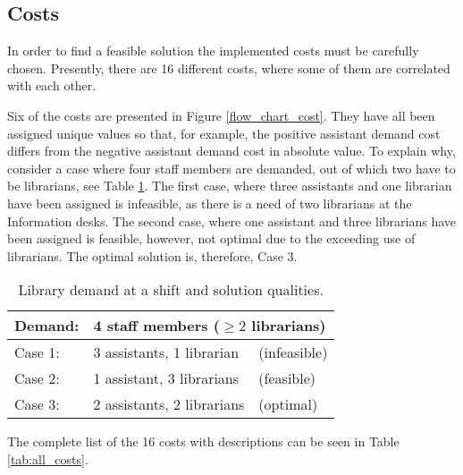     


\subsection{Costs}
In order to find a feasible solution the implemented costs must be carefully chosen. Presently, there are 16 different costs, where some of them are correlated with each other.

Six of the costs are presented in Figure \ref{flow_chart_cost}. They have all been assigned unique values so that, for example, the positive assistant demand cost differs from the negative assistant demand cost in absolute value. To explain why, consider a case where four staff members are demanded, out of which two have to be librarians, see Table \ref{library_solutions}. The first case, where three assistants and one librarian have been assigned is infeasible, as there is a need of two librarians at the Information desks. The second case, where one assistant and three librarians have been assigned is feasible, however, not optimal due to the exceeding use of librarians. The optimal solution is, therefore, Case 3.

\begin{table}[!h]
\centering
\caption{Library demand at a shift and solution qualities.}
\label{library_solutions}
\begin{tabular}{|l|l|l|}
\hline
\rowcolor[HTML]{C0C0C0} 
Demand:                         & \multicolumn{2}{l|}{\cellcolor[HTML]{C0C0C0}4 staff members ($\geq 2$ librarians)} \\ \hline
\rowcolor[HTML]{FD6864} 
\cellcolor[HTML]{C0C0C0}Case 1: & 3 assistants, 1 librarian                  & (infeasible)                 \\ \hline
\rowcolor[HTML]{FFFE65} 
\cellcolor[HTML]{C0C0C0}Case 2: & 1 assistant, 3 librarians                  & (feasible)                     \\ \hline
\rowcolor[HTML]{34FF34} 
\cellcolor[HTML]{C0C0C0}Case 3:  & 2 assistants, 2 librarians                 & (optimal)                      \\ \hline
\end{tabular}
\end{table}

The complete list of the 16 costs with descriptions can be seen in Table \ref{tab:all_costs}. 

